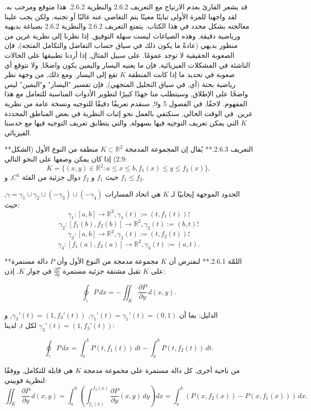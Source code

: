 قد يشعر القارئ بعدم الارتياح مع التعريف 2.6.2 والنظرية 2.6.2. هذا متوقع ومرحب به. لقد واجهنا للمرة الأولى تباينًا معينًا يتم التغاضي عنه غالبًا أو تجنبه, ولكن يجب علينا معالجته بشكل محدد في هذا الكتاب. يتمتع التعريف 2.6.2 والنظرية 2.6.2 بصياغة بديهية ورياضية دقيقة, وهذه الصياغات ليست سهلة التوفيق. إذا نظرنا إلى نظرية غرين من منظور بديهي (عادةً ما يكون ذلك في سياق حساب التفاضل والتكامل المتجه), فإن الصعوبة الحقيقية لا توجد عمومًا. على سبيل المثال, إذا أردنا تطبيقها على الحالات الناشئة في المشكلات الفيزيائية, فإن ما يعنيه اليسار واليمين يكون واضحًا, ولا نتوقع أي صعوبة في تحديد ما إذا كانت المنطقة \( K \) تقع إلى اليسار. ومع ذلك, من وجهة نظر رياضية بحتة (أي, في سياق التحليل المتجهي), فإن تفسير "اليسار" و"اليمين" ليس واضحًا على الإطلاق, وسيتطلب منا جهدًا كبيرًا لتطوير الأدوات المناسبة للتعامل مع هذا المفهوم. لاحقًا, في الفصول 5 و9, سنقدم تعريفًا دقيقًا للتوجيه ونسخة عامة من نظرية غرين. في الوقت الحالي, سنكتفي بالعمل نحو إثبات النظرية في بعض المناطق المحددة \( K \) التي يمكن تعريف التوجيه فيها بسهولة, والتي يتطابق تعريف التوجيه فيها مع حدسنا الفيزيائي.

**التعريف 2.6.3.** يُقال إن المجموعة المدمجة \( K \subset \mathbb{R}^2 \) منطقة من النوع الأول (الشكل 2.9) إذا كان يمكن وصفها على النحو التالي:
\[ K = \{ (x, y) \in \mathbb{R}^2 : a \leq x \leq b, f_1(x) \leq y \leq f_2(x) \}, \]
حيث \( f_1 \) و \( f_2 \) دوال جزئية من الفئة \( C^1 \), و \( f_1 \leq f_2 \).

الحدود الموجهة إيجابيًا لـ \( K \) هي اتحاد المسارات \( \gamma = \gamma_1 \cup \gamma_2 \cup (-\gamma_3) \cup (-\gamma_4) \), حيث:
\[ \gamma_1 : [a, b] \to \mathbb{R}^2, \gamma_1(t) := (t, f_1(t))؛ \]
\[ \gamma_2 : [f_1(b), f_2(b)] \to \mathbb{R}^2, \gamma_2(t) := (b, t)؛ \]
\[ \gamma_3 : [a, b] \to \mathbb{R}^2, \gamma_3(t) := (t, f_2(t))؛ \]
\[ \gamma_4 : [f_1(a), f_2(a)] \to \mathbb{R}^2, \gamma_4(t) := (a, t). \]

**اللمّة 2.6.1.** لنفترض أن \( K \) مجموعة مدمجة من النوع الأول وأن \( P \) دالة مستمرة على \( K \) تقبل مشتقة جزئية مستمرة \( \frac{\partial P}{\partial y} \) في جوار \( K \). إذن:

\[ \oint_{\gamma} P \, dx = -\iint_K \frac{\partial P}{\partial y} \, d(x, y). \]

الدليل: بما أن \( \gamma_1'(t) = \gamma_1'(t) = (0, 1) \), \( \gamma_3'(t) = (1, f_3'(t)) \), و \( \gamma_3'(t) = (1, f_3'(t)) \) لكل \( t \), لدينا:

\[ 
\oint_{\gamma} P \, dx = \int_a^b P(t, f_1(t)) \, dt - \int_a^b P(t, f_2(t)) \, dt.
\]

من ناحية أخرى, كل دالة مستمرة على مجموعة مدمجة \( K \) هي قابلة للتكامل, ووفقًا لنظرية فوبيني:
\[ \iint_K \frac{\partial P}{\partial y} \, d(x, y) = \int_a^b \left( \int_{f_1(x)}^{f_2(x)} \frac{\partial P}{\partial y} (x, y) \, dy \right) dx = \int_a^b (P(x, f_2(x)) - P(x, f_1(x))) \, dx. \]

